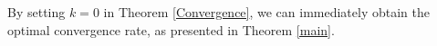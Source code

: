 %	

\begin{remark}\label{r3}
By setting $k=0$ in Theorem \ref{Convergence},  we can immediately obtain the optimal convergence rate, as presented in Theorem \ref{main}.
\end{remark}

%
%

